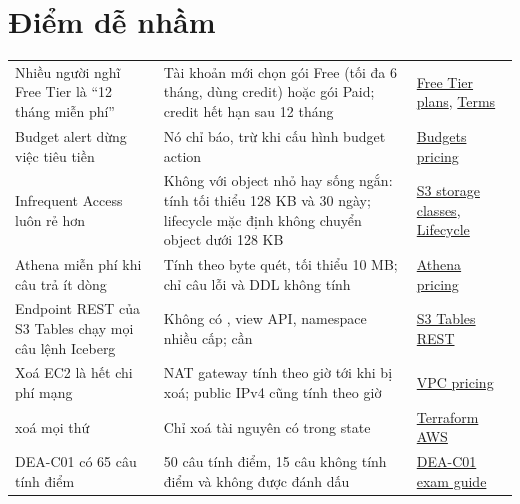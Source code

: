 \section{Điểm dễ nhầm}
\begin{xltabular}{\textwidth}{@{}P{4.0cm} L P{3.2cm}@{}}
\toprule
{} &  &  \\
\midrule
\endhead
\bottomrule
\endfoot
Nhiều người nghĩ Free Tier là ``12 tháng miễn phí'' & Tài khoản mới chọn gói Free (tối đa 6 tháng, dùng credit) hoặc gói Paid; credit hết hạn sau 12 tháng & \href{https://docs.aws.amazon.com/awsaccountbilling/latest/aboutv2/free-tier-plans.html}{Free Tier plans}, \href{https://aws.amazon.com/free/terms}{Terms} \\
Budget alert dừng việc tiêu tiền & Nó chỉ báo, trừ khi cấu hình budget action & \href{https://aws.amazon.com/aws-cost-management/aws-budgets/pricing/}{Budgets pricing} \\
Infrequent Access luôn rẻ hơn & Không với object nhỏ hay sống ngắn: tính tối thiểu 128 KB và 30 ngày; lifecycle mặc định không chuyển object dưới 128 KB & \href{https://docs.aws.amazon.com/AmazonS3/latest/userguide/storage-class-intro.html}{S3 storage classes}, \href{https://docs.aws.amazon.com/AmazonS3/latest/userguide/lifecycle-transition-general-considerations.html}{Lifecycle} \\
Athena miễn phí khi câu trả ít dòng & Tính theo byte quét, tối thiểu 10 MB; chỉ câu lỗi và DDL không tính & \href{https://aws.amazon.com/athena/pricing/}{Athena pricing} \\
Endpoint REST của S3 Tables chạy mọi câu lệnh Iceberg & Không có , view API, namespace nhiều cấp;  cần  & \href{https://docs.aws.amazon.com/AmazonS3/latest/userguide/s3-tables-integrating-open-source.html}{S3 Tables REST} \\
Xoá EC2 là hết chi phí mạng & NAT gateway tính theo giờ tới khi bị xoá; public IPv4 cũng tính theo giờ & \href{https://aws.amazon.com/vpc/pricing/}{VPC pricing} \\
 xoá mọi thứ & Chỉ xoá tài nguyên có trong state & \href{https://developer.hashicorp.com/terraform/tutorials/aws-get-started}{Terraform AWS} \\
DEA-C01 có 65 câu tính điểm & 50 câu tính điểm, 15 câu không tính điểm và không được đánh dấu & \href{https://docs.aws.amazon.com/aws-certification/latest/data-engineer-associate-01/data-engineer-associate-01.html}{DEA-C01 exam guide} \\
\end{xltabular}
